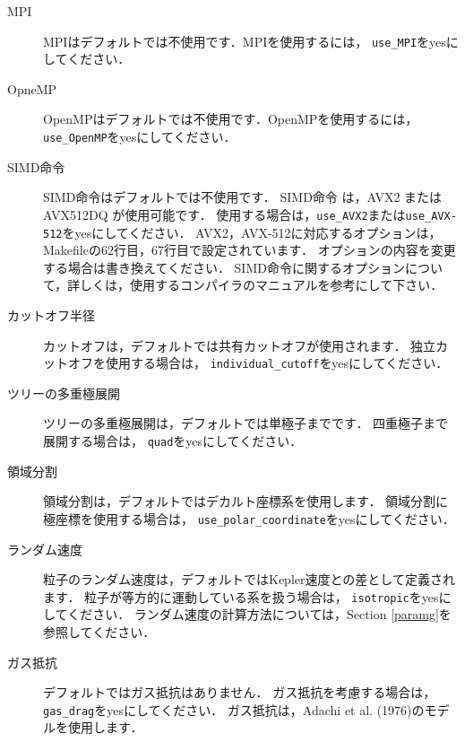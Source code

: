 \documentclass[12pt,a4paper,dvipdfmx]{jsarticle}
\begin{document}
\begin{description}
\item[MPI]
MPIはデフォルトでは不使用です．MPIを使用するには，
\texttt{use\_MPI}をyesにしてください．

\item[OpneMP]
OpenMPはデフォルトでは不使用です．OpenMPを使用するには，
\texttt{use\_OpenMP}をyesにしてください．

\item[SIMD命令]
SIMD命令はデフォルトでは不使用です．
SIMD命令 は，AVX2 または AVX512DQ が使用可能です．
使用する場合は，\texttt{use\_AVX2}または\texttt{use\_AVX-512}をyesにしてください．
AVX2，AVX-512に対応するオプションは，Makefileの62行目，67行目で設定されています．
オプションの内容を変更する場合は書き換えてください．
SIMD命令に関するオプションについて，詳しくは，使用するコンパイラのマニュアルを参考にして下さい．

\item[カットオフ半径]
カットオフは，デフォルトでは共有カットオフが使用されます．
独立カットオフを使用する場合は，%
\texttt{individual\_cutoff}をyesにしてください．


\item[ツリーの多重極展開]
ツリーの多重極展開は，デフォルトでは単極子までです．
四重極子まで展開する場合は， %
\texttt{quad}をyesにしてください．

\item[領域分割]
領域分割は，デフォルトではデカルト座標系を使用します．
領域分割に極座標を使用する場合は，
\texttt{use\_polar\_coordinate}をyesにしてください．


\item[ランダム速度]
粒子のランダム速度は，デフォルトではKepler速度との差として定義されます．
粒子が等方的に運動している系を扱う場合は，%
\texttt{isotropic}をyesにしてください．
ランダム速度の計算方法については，Section \ref{paramg}を参照してください．

\item[ガス抵抗]
デフォルトではガス抵抗はありません．
ガス抵抗を考慮する場合は，%
\texttt{gas\_drag}をyesにしてください．
ガス抵抗は，Adachi et al. (1976)のモデルを使用します．



\end{description}
\end{document}
